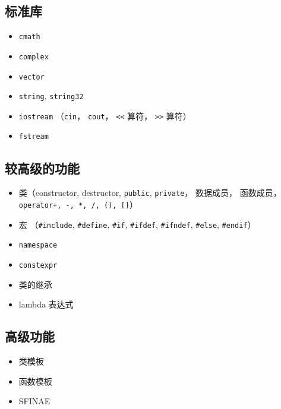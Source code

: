 \subsection{标准库}
\begin{itemize}
\item \verb|cmath|
\item \verb|complex|
\item \verb|vector|
\item \verb|string|, \verb|string32|
\item \verb|iostream| （\verb|cin|， \verb|cout|， \verb|<<| 算符， \verb|>>| 算符）
\item \verb|fstream|
\end{itemize}

\subsection{较高级的功能}
\begin{itemize}
\item 类（constructor, destructor, \verb|public|, \verb|private|， 数据成员， 函数成员， \verb|operator+, -, *, /, (), []|）
\item 宏 （\verb|#include|, \verb|#define|, \verb|#if|, \verb|#ifdef|, \verb|#ifndef|, \verb|#else|, \verb|#endif|）
\item \verb|namespace|
\item \verb|constexpr|
\item 类的继承
\item lambda 表达式
\end{itemize}

\subsection{高级功能}
\begin{itemize}
\item 类模板
\item 函数模板
\item SFINAE
\end{itemize}
